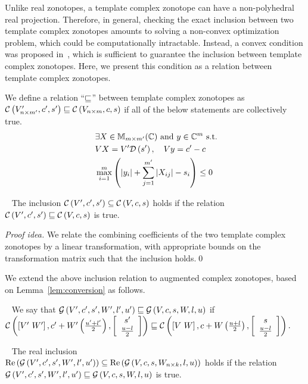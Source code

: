 Unlike real zonotopes, a template complex zonotope can have a
non-polyhedral real projection.  Therefore, in general, checking the
exact inclusion between two template complex zonotopes amounts to
solving a non-convex optimization problem, which could be
computationally intractable.  Instead, a convex condition was proposed
in~\cite{tcz2017}, which is sufficient to guarantee the inclusion
between template complex zonotopes.  Here, we present this condition
as a relation between template complex zonotopes.
%
\begin{definition}
We define a relation ``$\order$'' between template complex zonotopes
as\\ $\cz{V^\pr_{n\times m^\pr}}{c^\pr}{s^\pr}\order \cz{V_{n\times
    m}}{c}{s}$ if all of the below statements are collectively true.
\begin{align}~\label{eqn:tcz-inc}
\begin{split}
& \exists X\in\mat{m}{m^\pr}{\mb{C}}~\text{and}~y\in\mb{C}^{m}~\text{s.t.}\\
& \transfer{V}{V^\pr}{s^\pr}{X},~~~\centertransfer{V}{c}{c^\pr}{y}\\
& \scalebound{X}{y}{s}{m}{m^\pr}\leq 0\\
\end{split}
\end{align}
\end{definition}
%
\begin{lemma}~\label{lem:zon-zon} The
inclusion $\cz{V^\pr}{c^\pr}{s^\pr}\subseteq \cz{V}{c}{s}$ holds if
the relation $\cz{{V^\pr}}{c^\pr}{s^\pr}\order \cz{V}{c}{s}$ is true.
\end{lemma}
\emph{Proof idea.}
We relate the combining
coefficients of the two template complex zonotopes by a linear
transformation, with appropriate bounds on the transformation matrix
such that the inclusion holds.\qed

We extend the above inclusion relation to augmented complex zonotopes,
based on Lemma~\ref{lem:conversion} as follows.
%
\begin{definition}~\label{defn:gcz-order}
We say that $\gcz{V^\pr}{c^\pr}{s^\pr}{W^\pr}{l^\pr}{u^\pr}\order
\gcz{V}{c}{s}{W}{l}{u}$ if\\ $\cz{\lt[V^\pr~W^\pr\rt]}{c^\pr+W^\pr\lt(\frac{u^\pr+l^\pr}{2}\rt)}{\ColumnJoin{s^\pr}{\frac{u-l}{2}}}
\order
\cz{\lt[V~W\rt]}{c+W\lt(\frac{u+l}{2}\rt)}{\ColumnJoin{s}{\frac{u-l}{2}}}.$
\end{definition}
%
\begin{lemma}~\label{lem:gcz-gcz} The real inclusion\\
$\real\lt(\gcz{V^\pr}{c^\pr}{s^\pr}{W^\pr}{l^\pr}{u^\pr}\rt)\subseteq \real\lt(\gcz{V}{c}{s}{W_{n\times
k}}{l}{u}\rt)$ holds if the relation\\
$\gcz{V^\pr}{c^\pr}{s^\pr}{W^\pr}{l^\pr}{u^\pr}\order \gcz{V}{c}{s}{W}{l}{u}$ is true.
\end{lemma}


